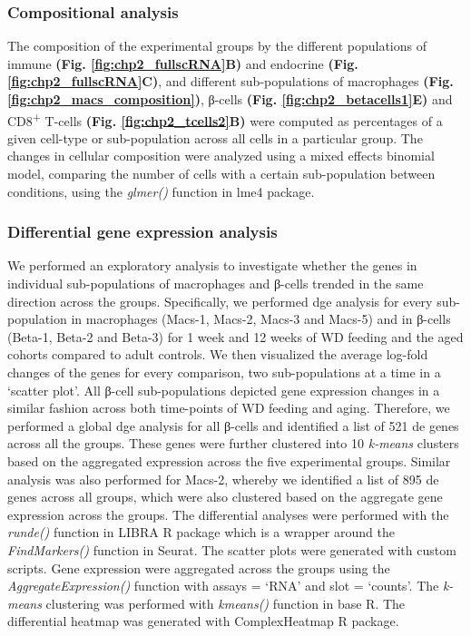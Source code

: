 \subsubsection{\large Compositional analysis}
The composition of the experimental groups by the different populations of immune \textbf{(Fig. \ref{fig:chp2_fullscRNA}B)} and endocrine \textbf{(Fig. \ref{fig:chp2_fullscRNA}C)}, and different sub-populations of macrophages \textbf{(Fig. \ref{fig:chp2_macs_composition})}, β-cells \textbf{(Fig. \ref{fig:chp2_betacells1}E)} and CD8\textsuperscript{+} T-cells \textbf{(Fig. \ref{fig:chp2_tcells2}B)} were computed as percentages of a given cell-type or sub-population across all cells in a particular group. The changes in cellular composition were analyzed using a mixed effects binomial model, comparing the number of cells with a certain sub-population between conditions, using the \textit{glmer()} function in lme4 package.

\subsubsection{\large Differential gene expression analysis}
We performed an exploratory analysis to investigate whether the genes in individual sub-populations of macrophages and β-cells trended in the same direction across the groups. Specifically, we performed \gls{dge} analysis for every sub-population in macrophages (Macs-1, Macs-2, Macs-3 and Macs-5) and in β-cells (Beta-1, Beta-2 and Beta-3) for 1 week and 12 weeks of WD feeding and the aged cohorts compared to adult controls. We then visualized the average log-fold changes of the genes for every comparison, two sub-populations at a time in a `scatter plot'. All β-cell sub-populations depicted gene expression changes in a similar fashion across both time-points of WD feeding and aging. Therefore, we performed a global \gls{dge} analysis for all β-cells and identified a list of 521 \gls{de} genes across all the groups. These genes were further clustered into 10 \textit{k-means} clusters based on the aggregated expression across the five experimental groups. Similar analysis was also performed for Macs-2, whereby we identified a list of 895 \gls{de} genes across all groups, which were also clustered based on the aggregate gene expression across the groups. The differential analyses were performed with the \textit{run\textunderscore de()} function in LIBRA R package \textbf{\cite{}} which is a wrapper around the \textit{FindMarkers()} function in Seurat. The scatter plots were generated with custom scripts. Gene expression were aggregated across the groups using the \textit{AggregateExpression()} function with assays = ‘RNA’ and slot = ‘counts’. The \textit{k-means} clustering was performed with \textit{kmeans()} function in base R. The differential heatmap was generated with ComplexHeatmap R package.

